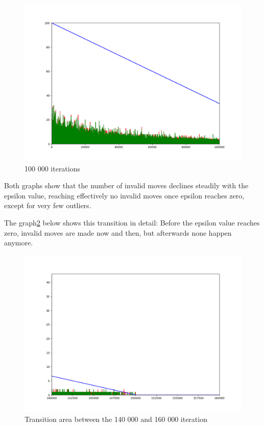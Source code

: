 \begin{figure}[H]
	\centering
  	\includegraphics[width=\textwidth]{../plot_100k.png}
	\caption{100 000 iterations}
	\label{fig2}
\end{figure}

Both graphs show that the number of invalid moves declines steadily with the epsilon value, reaching effectively no invalid moves once epsilon reaches zero, except for very few outliers.

The graph\ref{fig3} below shows this transition in detail: Before the epsilon value reaches zero, invalid moves are made now and then, but afterwards none happen anymore.
\begin{figure}[H]
	\centering
  	\includegraphics[width=\textwidth]{../plot_500k_transition.png}
	\caption{Transition area between the 140 000 and 160 000 iteration}
	\label{fig3}
\end{figure}

